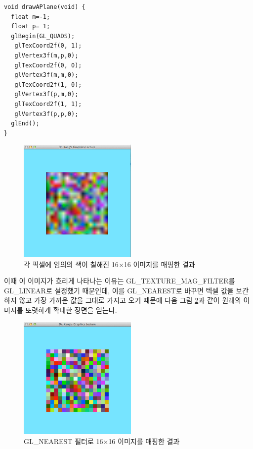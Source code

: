 \begin{algorithmbis}\label{code:OGL_texture:textureCoord}
\lstset{language=C++} 
\begin{lstlisting}
void drawAPlane(void) {
  float m=-1;
  float p= 1;
  glBegin(GL_QUADS);
   glTexCoord2f(0, 1);
   glVertex3f(m,p,0); 
   glTexCoord2f(0, 0);
   glVertex3f(m,m,0); 
   glTexCoord2f(1, 0);
   glVertex3f(p,m,0); 
   glTexCoord2f(1, 1);
   glVertex3f(p,p,0);
  glEnd();
}
\end{lstlisting}
\end{algorithmbis}


\begin{figure}[h!]
  \centering
	\includegraphics[height=6cm]{OGL_texture/texMap1.png}
    \caption{각 픽셀에 임의의 색이 칠해진 16$\times$16 이미지를 매핑한 결과}
    \label{fig:OGL_texture:texMap1}
\end{figure}

이때 이 이미지가 흐리게 나타나는 이유는 {\sf GL\_TEXTURE\_MAG\_FILTER}를 {\sf GL\_LINEAR}로 
설정했기 때문인데, 이를 {\sf GL\_NEAREST}로 바꾸면 텍셀 값을 보간하지 않고 가장 가까운 값을 그대로 가지고 오기 때문에
다음 그림 \ref{fig:OGL_texture:texMap2}과 같이 원래의 이미지를 또렷하게 확대한 장면을 얻는다.

\begin{figure}[h!]
  \centering
	\includegraphics[height=6cm]{OGL_texture/texMap2.png}
    \caption{GL\_NEAREST 필터로 16$\times$16 이미지를 매핑한 결과}
    \label{fig:OGL_texture:texMap2}
\end{figure}

